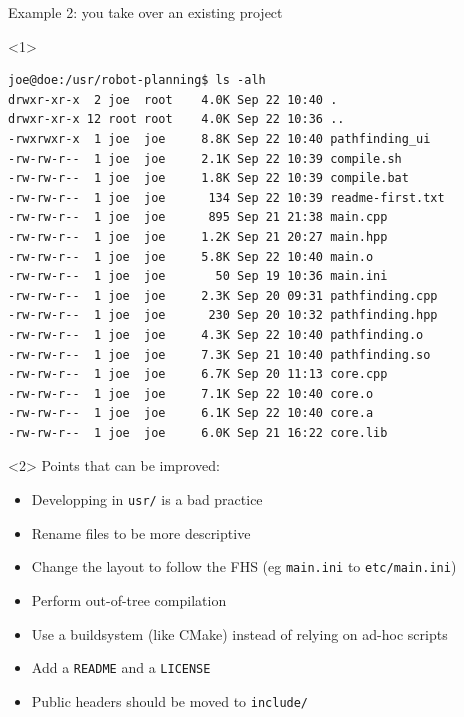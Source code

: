 \documentclass[compress]{beamer}
\begin{document}
\begin{frame}[fragile]{Example 2: you take over an existing project}


\begin{onlyenv}<1>
\begin{verbatim}
joe@doe:/usr/robot-planning$ ls -alh
drwxr-xr-x  2 joe  root    4.0K Sep 22 10:40 .
drwxr-xr-x 12 root root    4.0K Sep 22 10:36 ..
-rwxrwxr-x  1 joe  joe     8.8K Sep 22 10:40 pathfinding_ui
-rw-rw-r--  1 joe  joe     2.1K Sep 22 10:39 compile.sh
-rw-rw-r--  1 joe  joe     1.8K Sep 22 10:39 compile.bat
-rw-rw-r--  1 joe  joe      134 Sep 22 10:39 readme-first.txt
-rw-rw-r--  1 joe  joe      895 Sep 21 21:38 main.cpp
-rw-rw-r--  1 joe  joe     1.2K Sep 21 20:27 main.hpp
-rw-rw-r--  1 joe  joe     5.8K Sep 22 10:40 main.o
-rw-rw-r--  1 joe  joe       50 Sep 19 10:36 main.ini
-rw-rw-r--  1 joe  joe     2.3K Sep 20 09:31 pathfinding.cpp
-rw-rw-r--  1 joe  joe      230 Sep 20 10:32 pathfinding.hpp
-rw-rw-r--  1 joe  joe     4.3K Sep 22 10:40 pathfinding.o
-rw-rw-r--  1 joe  joe     7.3K Sep 21 10:40 pathfinding.so
-rw-rw-r--  1 joe  joe     6.7K Sep 20 11:13 core.cpp
-rw-rw-r--  1 joe  joe     7.1K Sep 22 10:40 core.o
-rw-rw-r--  1 joe  joe     6.1K Sep 22 10:40 core.a
-rw-rw-r--  1 joe  joe     6.0K Sep 21 16:22 core.lib
\end{verbatim}

\end{onlyenv}

    \begin{onlyenv}<2>
        Points that can be improved:

        \begin{itemize}
            \item Developping in \texttt{usr/} is a bad practice
            \item Rename files to be more descriptive
            \item Change the layout to follow the FHS (eg \texttt{main.ini} to
                \texttt{etc/main.ini})
            \item Perform out-of-tree compilation
            \item Use a buildsystem (like CMake) instead of relying on ad-hoc scripts
            \item Add a \texttt{README} and a \texttt{LICENSE}
            \item Public headers should be moved to \texttt{include/}
        \end{itemize}
    \end{onlyenv}
\end{frame}
\end{document}
